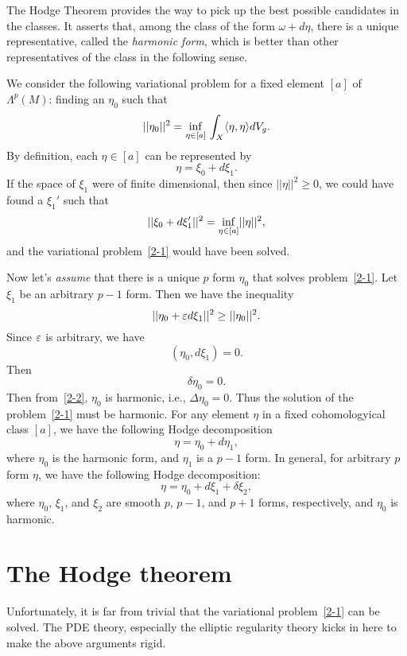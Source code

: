 The Hodge Theorem provides the way to pick up the best possible candidates in the classes. It asserts that, among the class of the form
$\omega+d\eta$, there is a unique representative, called
the {\it harmonic form}, which is better than other representatives of the class in the
following sense.




We consider the following variational problem for a fixed
element $[a]$ of $\Lambda^p(M)$: finding an $\eta_0$ such
that
\begin{equation}\label{2-1}
||\eta_0||^2
=\underset{\eta\in[a]}{\rm inf}\,\int_X\langle\eta,\eta\rangle dV_g.
\end{equation}
By definition,
each $\eta\in [a]$ can be represented  by
\[
\eta=\xi_0+d\xi_1.
\]
If the space of $\xi_1$ were of finite dimensional, then since
$||\eta||^2\geq 0$, we could have found a $\xi_1'$
such that
\[
||\xi_0+d\xi_1'||^2=\underset{\eta\in[a]}{\rm inf}
||\eta||^2,
\]
and the variational problem~\eqref{2-1} would have been solved.

Now let's {\it assume}
that there is a unique $p$  form $\eta_0$
that solves  problem~\eqref{2-1}. Let $\xi_1$ be an arbitrary
$p-1$ form.  Then we have the
inequality
\[
||\eta_0+\varepsilon d\xi_1||^2\geq||\eta_0||^2.
\]
Since $\varepsilon$ is arbitrary, we have
\[
(\eta_0,d\xi_1)=0.
\]
Then
\begin{equation}\label{2-2}
\delta\eta_0=0.
\end{equation}
Then from~\eqref{2-2}, $\eta_0$ is harmonic, i.e.,
$\Delta\eta_0=0
$. Thus the solution of the problem~\eqref{2-1} must be
harmonic.
 For any element $\eta$
in a fixed cohomologyical class $[a]$, we have the following
Hodge decomposition
\[
\eta=\eta_0+d \eta_1,
\]
where $\eta_0$ is the harmonic form, and $\eta_1$ is a $p-1$ form.
In general, for arbitrary $p$ form $\eta$, we have the following Hodge
decomposition:
\[
\eta=\eta_0+d\xi_1+\delta\xi_2,
\]
where $\eta_0$, $\xi_1$, and $\xi_2$ are smooth 
$p$, $p-1$, and $p+1$ forms, respectively,
and $\eta_0$ is harmonic. 

\section{The Hodge theorem}
Unfortunately, it is far from trivial that the variational
problem~\eqref{2-1} can be solved. The PDE theory, especially
the elliptic regularity theory kicks in here to make the above
arguments  rigid. 




